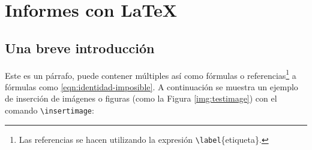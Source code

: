 %
%

\section{Informes con \LaTeX}
	
	\subsection{Una breve introducción}
		
		Este es un párrafo, puede contener múltiples  así como fórmulas o referencias\footnote{Las referencias se hacen utilizando la expresión \texttt{\textbackslash label}\{etiqueta\}.} a fórmulas como \eqref{eqn:identidad-imposible}. A continuación se muestra un ejemplo de inserción de imágenes o figuras (como la Figura \ref{img:testimage}) con el comando \texttt{\textbackslash insertimage}:
		
		

